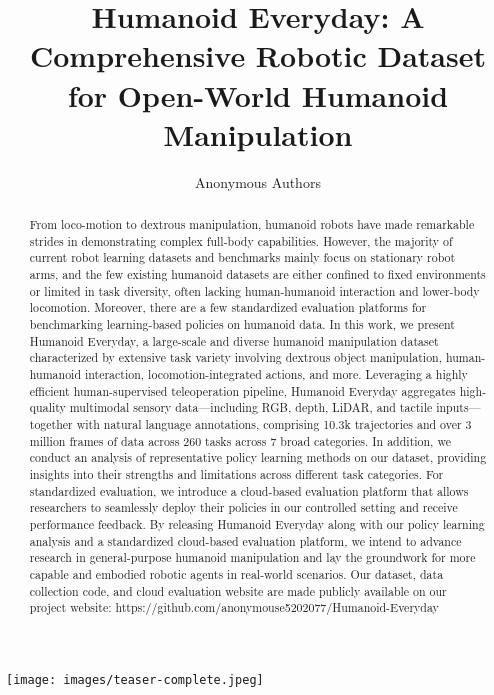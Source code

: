 \documentclass[letterpaper, 10pt, conference]{ieeeconf}
\begin{document}
\title{\LARGE \bf Humanoid Everyday: A Comprehensive Robotic Dataset \\for Open-World Humanoid Manipulation}

\author{%
Anonymous Authors 
}

\maketitle



\begin{strip}
  \centering
  \texttt{[image: images/teaser-complete.jpeg]}
  \label{fig:teaser}
\end{strip}

\begin{abstract}
From loco-motion to dextrous manipulation, humanoid robots have made remarkable strides in demonstrating complex full-body capabilities. However, the majority of current robot learning datasets and benchmarks mainly focus on stationary robot arms, and the few existing humanoid datasets are either confined to fixed environments or limited in task diversity, often lacking human-humanoid interaction and lower-body locomotion. Moreover, there are a few standardized evaluation platforms for benchmarking learning-based policies on humanoid data. In this work, we present Humanoid Everyday, a large-scale and diverse humanoid manipulation dataset characterized by extensive task variety involving dextrous object manipulation, human-humanoid interaction, locomotion-integrated actions, and more. Leveraging a highly efficient human-supervised teleoperation pipeline, Humanoid Everyday aggregates high-quality multimodal sensory data—including RGB, depth, LiDAR, and tactile inputs—together with natural language annotations, comprising 10.3k trajectories and over 3 million frames of data across 260 tasks across 7 broad categories. In addition, we conduct an analysis of representative policy learning methods on our dataset, providing insights into their strengths and limitations across different task categories. For standardized evaluation, we introduce a cloud-based evaluation platform that allows researchers to seamlessly deploy their policies in our controlled setting and receive performance feedback. By releasing Humanoid Everyday along with our policy learning analysis and a standardized cloud-based evaluation platform, we intend to advance research in general-purpose humanoid manipulation and lay the groundwork for more capable and embodied robotic agents in real-world scenarios. Our dataset, data collection code, and cloud evaluation website are made publicly available on our project website: https://github.com/anonymouse5202077/Humanoid-Everyday
\end{abstract}
\end{document}
